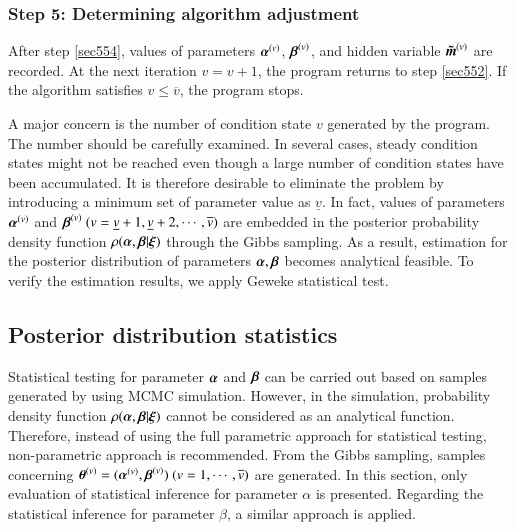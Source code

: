 \documentclass[a4paper,oneside,onecolumn,preprint,10pt,authoryear]{elsarticle}
\begin{document}
\subsubsection{Step 5: Determining algorithm adjustment} \label{sec555}
After step \ref{sec554}, values of parameters $\mbox{\boldmath$\alpha$}^{(v)}$, $\mbox{\boldmath$\beta$}^{(v)}$, and hidden variable $\mbox{\boldmath$\tilde{m}$}^{(v)}$ are recorded. At the next iteration $v=v+1$, the program returns to step \ref{sec552}. If the algorithm satisfies $v\leq \overline{v}$, the program stops. 

A major concern is the number of condition state $v$ generated by the program. The number should be carefully examined. In several cases, steady condition states might not be reached even though a large number of condition states have been accumulated. It is therefore desirable to eliminate the problem by introducing a minimum set of parameter value as $\underline{v}$. In fact, values of parameters $\mbox{\boldmath$\alpha$}^{(v)}$ and $\mbox{\boldmath$\beta$}^{(v)}~(v=\underline{v}+1,\underline{v}+2,\cdots,\overline{v})$ are embedded in the posterior probability density function $\rho(\mbox{\boldmath$\alpha$},\mbox{\boldmath$\beta$}|\mbox{\boldmath$\xi$})$ through the Gibbs sampling. As a result, estimation for the posterior distribution of parameters $\mbox{\boldmath$\alpha$},\mbox{\boldmath$\beta$}$ becomes analytical feasible. To verify the estimation results, we apply Geweke statistical test.  
\subsection{Posterior distribution statistics} \label{sec56}
Statistical testing for parameter $\mbox{\boldmath$\alpha$}$ and $\mbox{\boldmath$\beta$}$ can be carried out based on samples generated by using MCMC simulation. However, in the simulation, probability density function $\rho(\mbox{\boldmath$\alpha$},\mbox{\boldmath$\beta$}|\mbox{\boldmath$\xi$})$ cannot  be considered as an analytical function. Therefore, instead of using the full parametric approach for statistical testing, non-parametric approach is recommended. From the Gibbs sampling, samples concerning $\mbox{\boldmath$\theta$}^{(v)}=(\mbox{\boldmath$\alpha$}^{(v)},\mbox{\boldmath$\beta$}^{(v)})~(v=1,\cdots,\overline{v})$ are generated. In this section, only evaluation of statistical inference for parameter $\alpha$ is presented. Regarding the statistical inference for parameter $\beta$, a similar approach is applied.
\end{document}

